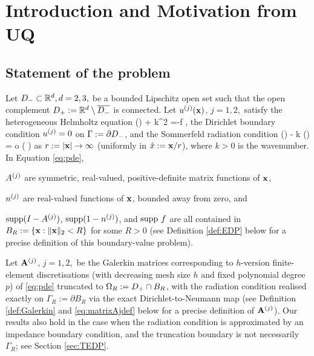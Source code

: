 
\section{Introduction and Motivation from UQ}\label{sec:intronbpc}

\subsection{Statement of the problem}\label{sec:problem}

Let $D_{-} \subset \mathbb R^{d}, d=2,3, $ be a bounded Lipschitz open set such that the open complement $D_{+}:= \mathbb R^{d}\setminus\overline{D_{-}}$ is connected. 
Let $u^{(j)}(\mathbf{x})$, $j=1,2,$ satisfy 
the heterogeneous Helmholtz equation
\beq\label{eq:pde}
\nabla\cdot(\Aj \nabla\uj ) + k^2 \nj \uj =-f \quad \tin \Dp,
\eeq
the Dirichlet boundary condition $u^{(j)}=0$ on $\Gamma:= \partial D_{-}$, and the Sommerfeld radiation condition 
\beq\label{eq:srcnbpc}
(\bx) - \ri k \uj(\bx) = o \left( \right)
\eeq
as $r:= |\mathbf{x}|\rightarrow \infty$ (uniformly in $\hat{x}:= \mathbf{x}/r$),
where $k>0$ is the wavenumber. In Equation \eqref{eq:pde},
\ben
\item $A^{(j)}$ are symmetric, real-valued, positive-definite  matrix functions of $\mathbf{x}$, 
\item $n^{(j)}$ are real-valued functions of $\mathbf{x}$, bounded away from zero, and 
\item $\operatorname{supp}(I-A^{(j)})$, $\operatorname{supp}(1-n^{(j)})$, and $\operatorname{supp}\, f$ are all %
contained in $B_R:= \{\mathbf{x} : \|\mathbf{x}\|_2<R\}$ for some $R>0$
\een
(see Definition \ref{def:EDP} below for a precise definition of this boundary-value problem).

Let $\mathbf{A}^{(j)}$, $j=1,2,$ be the Galerkin matrices corresponding to $h$-version finite-element discretisations (with decreasing mesh size $h$ and fixed polynomial degree $p$)
of \eqref{eq:pde} truncated to $\Omega_R:= D_{+} \cap B_R$, with the radiation condition realised exactly on $\Gamma_R:=\partial B_R$ via the exact Dirichlet-to-Neumann map (see Definition \ref{def:Galerkin} and \eqref{eq:matrixAjdef} below for a precise definition of $\mathbf{A}^{(j)}$). Our results also hold in the case when the radiation condition is approximated by an impedance boundary condition, and the truncation boundary is not necessarily $\Gamma_R$; see Section \ref{sec:TEDP}.
 
